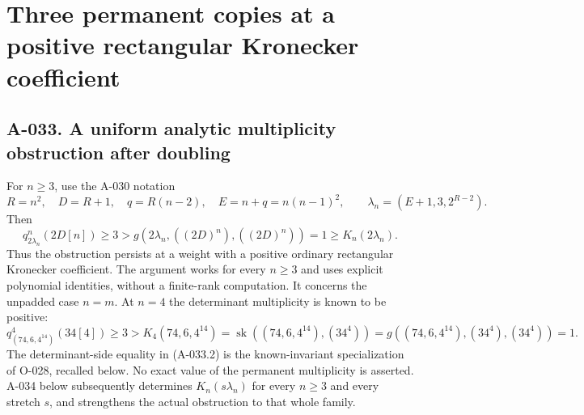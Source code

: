 \section{Three permanent copies at a positive rectangular Kronecker coefficient}

\subsection*{A-033. A uniform analytic multiplicity obstruction after doubling}
For \(n\geq3\), use the A-030 notation
\[
 R=n^2,\quad D=R+1,\quad q=R(n-2),\quad E=n+q=n(n-1)^2,
 \qquad\lambda_n=(E+1,3,2^{R-2}).
\]
Then
\[
 \boxed{\quad
 q^n_{2\lambda_n}(2D[n])\geq3
   >g(2\lambda_n,((2D)^n),((2D)^n))=1
   \geq K_n(2\lambda_n).
 \quad}                                                       \tag{A-033.1}
\]
Thus the obstruction persists at a weight with a positive
ordinary rectangular Kronecker coefficient. The argument works
for every \(n\geq3\) and uses explicit polynomial identities,
without a finite-rank computation.
It concerns the unpadded case \(n=m\).
At \(n=4\) the determinant multiplicity is known to be positive:
\[
 q^4_{(74,6,4^{14})}(34[4])\geq3
       >K_4(74,6,4^{14})
       =\operatorname{sk}((74,6,4^{14}),(34^4))
       =g((74,6,4^{14}),(34^4),(34^4))=1.                       \tag{A-033.2}
\]
The determinant-side equality in (A-033.2) is the known-invariant
specialization of O-028, recalled below. No exact value of the
permanent multiplicity is asserted. A-034 below subsequently
determines \(K_n(s\lambda_n)\) for every \(n\geq3\) and every
stretch \(s\), and strengthens the actual obstruction to that
whole family.

